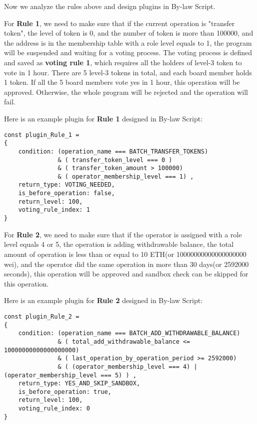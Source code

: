 \documentclass[main.tex]{subfiles}
\begin{document}
Now we analyze the rules above and design plugins in By-law Script.

For \textbf{Rule 1}, we need to make sure that if the current operation is "transfer token", the level of token is 0, and the number of token is more than 100000, and the address is in the membership table with a role level equals to 1, the program will be suspended and waiting for a voting process. The voting process is defined and saved as \textbf{voting rule 1}, which requires all the holders of level-3 token to vote in 1 hour. There are 5 level-3 tokens in total, and each board member holds 1 token. If all the 5 board members vote yes in 1 hour, this operation will be approved. Otherwise, the whole program will be rejected and the operation will fail.

Here is an example plugin for \textbf{Rule 1} designed in By-law Script:

\begin{verbatim}
const plugin_Rule_1 = 
{
    condition: (operation_name === BATCH_TRANSFER_TOKENS)
               & ( transfer_token_level === 0 )
               & ( transfer_token_amount > 100000) 
               & ( operator_membership_level === 1) ,
    return_type: VOTING_NEEDED,
    is_before_operation: false,
    return_level: 100,
    voting_rule_index: 1
}
\end{verbatim}

For \textbf{Rule 2}, we need to make sure that if the operator is assigned with a role level equals 4 or 5, the operation is adding withdrawable balance, the total amount of operation is less than or equal to 10 ETH(or 10000000000000000000 wei), and the operator did the same operation in more than 30 days(or 2592000 seconds), this operation will be approved and sandbox check can be skipped for this operation.

Here is an example plugin for \textbf{Rule 2} designed in By-law Script:

\begin{verbatim}
const plugin_Rule_2 = 
{
    condition: (operation_name === BATCH_ADD_WITHDRAWABLE_BALANCE)
               & ( total_add_withdrawable_balance <= 10000000000000000000)
               & ( last_operation_by_operation_period >= 2592000) 
               & ( (operator_membership_level === 4) | (operator_membership_level === 5) ) ,
    return_type: YES_AND_SKIP_SANDBOX,
    is_before_operation: true,
    return_level: 100,
    voting_rule_index: 0
}
\end{verbatim}
\end{document}
